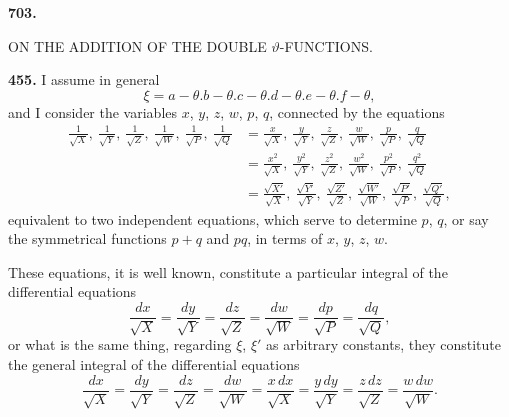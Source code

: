 \documentclass[11pt,a4paper]{book}
\begin{document}
\begin{center}
\large\bfseries 703.\par\vspace{0.3em}
ON THE ADDITION OF THE DOUBLE $\vartheta$-FUNCTIONS.\par\vspace{0.5em}
\normalsize{}
\end{center}

\vspace{1em}

\noindent\textbf{455.}\quad
I assume in general
\[
\xi = a - \theta . b - \theta . c - \theta . d - \theta . e - \theta . f - \theta,
\]
and I consider the variables $x$, $y$, $z$, $w$, $p$, $q$, connected by the equations
\begin{align*}
\frac{1}{\sqrt{X}},\ \frac{1}{\sqrt{Y}},\ \frac{1}{\sqrt{Z}},\ \frac{1}{\sqrt{W}},\ \frac{1}{\sqrt{P}},\ \frac{1}{\sqrt{Q}} &=
\frac{x}{\sqrt{X}},\ \frac{y}{\sqrt{Y}},\ \frac{z}{\sqrt{Z}},\ \frac{w}{\sqrt{W}},\ \frac{p}{\sqrt{P}},\ \frac{q}{\sqrt{Q}} \\
&= \frac{x^2}{\sqrt{X}},\ \frac{y^2}{\sqrt{Y}},\ \frac{z^2}{\sqrt{Z}},\ \frac{w^2}{\sqrt{W}},\ \frac{p^2}{\sqrt{P}},\ \frac{q^2}{\sqrt{Q}} \\
&= \frac{\sqrt{X'}}{\sqrt{X}},\ \frac{\sqrt{Y'}}{\sqrt{Y}},\ \frac{\sqrt{Z'}}{\sqrt{Z}},\ \frac{\sqrt{W'}}{\sqrt{W}},\ \frac{\sqrt{P'}}{\sqrt{P}},\ \frac{\sqrt{Q'}}{\sqrt{Q}},
\end{align*}
equivalent to two independent equations, which serve to determine $p$, $q$, or say the symmetrical functions $p + q$ and $pq$, in terms of $x$, $y$, $z$, $w$.

These equations, it is well known, constitute a particular integral of the differential equations
\[
\frac{dx}{\sqrt{X}} = \frac{dy}{\sqrt{Y}} = \frac{dz}{\sqrt{Z}} = \frac{dw}{\sqrt{W}} = \frac{dp}{\sqrt{P}} = \frac{dq}{\sqrt{Q}},
\]
or what is the same thing, regarding $\xi$, $\xi'$ as arbitrary constants, they constitute the general integral of the differential equations
\[
\frac{dx}{\sqrt{X}} = \frac{dy}{\sqrt{Y}} = \frac{dz}{\sqrt{Z}} = \frac{dw}{\sqrt{W}} = \frac{x\,dx}{\sqrt{X}} = \frac{y\,dy}{\sqrt{Y}} = \frac{z\,dz}{\sqrt{Z}} = \frac{w\,dw}{\sqrt{W}}.
\]
\end{document}
